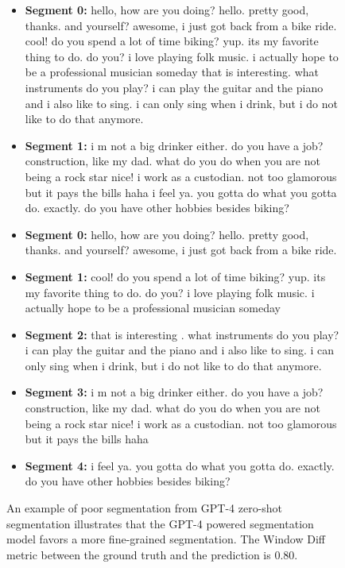 \begin{figure}[htbp]
    \small
\begin{tcolorbox}[left=3pt,right=3pt,top=3pt,bottom=3pt,title=\textbf{Ground-truth Segment:}]
\begin{itemize}
\item \textbf{Segment 0: }
hello, how are you doing?
hello. pretty good, thanks. and yourself?
awesome, i just got back from a bike ride.
cool! do you spend a lot of time biking?
yup. its my favorite thing to do. do you?
i love playing folk music. i actually hope to be a professional musician someday
that is interesting. what instruments do you play?
i can play the guitar and the piano and i also like to sing.
i can only sing when i drink, but i do not like to do that anymore.
\item \textbf{Segment 1: }
i m not a big drinker either. do you have a job?
construction, like my dad. what do you do when you are not being a rock star
nice! i work as a custodian. not too glamorous but it pays the bills haha
i feel ya. you gotta do what you gotta do.
exactly. do you have other hobbies besides biking?
\end{itemize}
\end{tcolorbox}
\begin{tcolorbox}[left=3pt,right=3pt,top=3pt,bottom=3pt,title=\textbf{Predicted Segment:}]
\begin{itemize}
\item \textbf{Segment 0: }
hello, how are you doing?
hello. pretty good, thanks. and yourself?
awesome, i just got back from a bike ride.
\item \textbf{Segment 1: }
cool! do you spend a lot of time biking?
yup. its my favorite thing to do. do you?
i love playing folk music. i actually hope to be a professional musician someday

\item \textbf{Segment 2: }
that is interesting . what instruments do you play?
i can play the guitar and the piano and i also like to sing.
i can only sing when i drink, but i do not like to do that anymore.

\item \textbf{Segment 3: }
i m not a big drinker either. do you have a job?
construction, like my dad. what do you do when you are not being a rock star
nice! i work as a custodian. not too glamorous but it pays the bills haha

    \item \textbf{Segment 4: }
i feel ya. you gotta do what you gotta do.
exactly. do you have other hobbies besides biking?
\end{itemize}
\end{tcolorbox}
\caption{An example of poor segmentation from GPT-4 zero-shot segmentation illustrates that the GPT-4 powered segmentation model favors a more fine-grained segmentation. The Window Diff metric between the ground truth and the prediction is 0.80.}
\label{fig: poorly_segmented_example}
\end{figure}